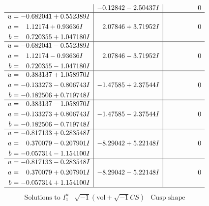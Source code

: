 \documentclass[1p]{elsarticle_modified}
\theoremstyle{definition}
\newcommand{\I}{\sqrt{-1}}
\begin{document}
$$\begin{array}{c|c|c}
 & -0.12842 - 2.50437 I & \phantom{-0.000000 } 0 \\ \hline\begin{aligned}
u &= -0.682041 + 0.552389 I \\
a &= \phantom{-}1.12174 + 0.93636 I \\
b &= \phantom{-}0.720355 + 1.047180 I\end{aligned}
 & \phantom{-}2.07846 + 3.71952 I & \phantom{-0.000000 } 0 \\ \hline\begin{aligned}
u &= -0.682041 - 0.552389 I \\
a &= \phantom{-}1.12174 - 0.93636 I \\
b &= \phantom{-}0.720355 - 1.047180 I\end{aligned}
 & \phantom{-}2.07846 - 3.71952 I & \phantom{-0.000000 } 0 \\ \hline\begin{aligned}
u &= \phantom{-}0.383137 + 1.058970 I \\
a &= -0.133273 - 0.806743 I \\
b &= -0.182506 + 0.719748 I\end{aligned}
 & -1.47585 + 2.37544 I & \phantom{-0.000000 } 0 \\ \hline\begin{aligned}
u &= \phantom{-}0.383137 - 1.058970 I \\
a &= -0.133273 + 0.806743 I \\
b &= -0.182506 - 0.719748 I\end{aligned}
 & -1.47585 - 2.37544 I & \phantom{-0.000000 } 0 \\ \hline\begin{aligned}
u &= -0.817133 + 0.283548 I \\
a &= \phantom{-}0.370079 - 0.207901 I \\
b &= -0.057314 - 1.154100 I\end{aligned}
 & -8.29042 + 5.22148 I & \phantom{-0.000000 } 0 \\ \hline\begin{aligned}
u &= -0.817133 - 0.283548 I \\
a &= \phantom{-}0.370079 + 0.207901 I \\
b &= -0.057314 + 1.154100 I\end{aligned}
 & -8.29042 - 5.22148 I & \phantom{-0.000000 } 0\\
 \hline 
 \end{array}$$\newpage$$\begin{array}{c|c|c}  
\text{Solutions to }I^u_{1}& \I (\text{vol} + \sqrt{-1}CS) & \text{Cusp shape}\\

\end{array}$$
\end{document}
